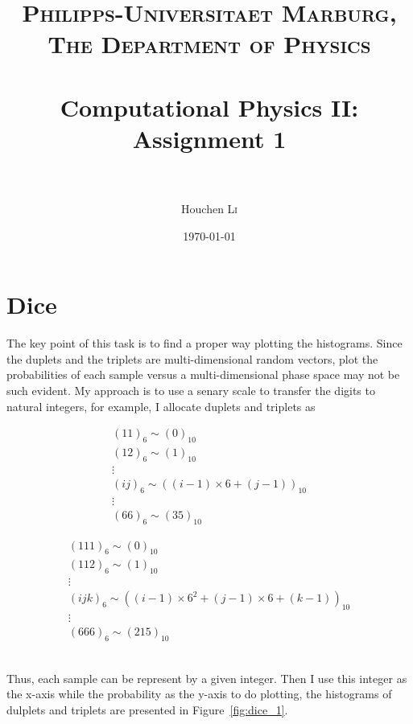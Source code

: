 \documentclass[paper=a4, fontsize=11pt]{scrartcl} %
\title{	
	\normalfont \normalsize 
	\textsc{Philipps-Universitaet Marburg, The Department of Physics} \\ [25pt] %
	\horrule{0.5pt} \\[0.4cm] %
	\huge Computational Physics II: Assignment 1 \\ %
	\horrule{2pt} \\[0.5cm] %
}
\author{Houchen \textsc{Li}} %
\date{\normalsize\today} %
\numberwithin{equation}{section} %
\numberwithin{figure}{section} %
\numberwithin{table}{section} %
\begin{document}
\maketitle %


\section{Dice}

The key point of this task is to find a proper way plotting the histograms. Since the duplets and the triplets are multi-dimensional random vectors, plot the probabilities of each sample versus a multi-dimensional phase space may not be such evident. My approach is to use a senary scale to transfer the digits to natural integers, for example, I allocate duplets and triplets as \\
\begin{minipage}[b]{0.4\linewidth}
\centering
\begin{gather*}
	\left( 11 \right)_6\sim \left(0\right)_{10}\\
	\left( 12 \right)_6\sim \left(1\right)_{10}\\
	\vdots\\
	\left( ij \right)_6\sim \left( \left(i-1\right)\times 6+\left(j-1\right) \right)_{10}\\
	\vdots\\
	\left( 66 \right)_6\sim \left(35\right)_{10}
\end{gather*}
\end{minipage}
\begin{minipage}[b]{0.59\linewidth}
\centering
\begin{gather*}
	\left( 111 \right)_6\sim \left(0\right)_{10}\\
	\left( 112 \right)_6\sim \left(1\right)_{10}\\
	\vdots\\
	\left( ijk \right)_6\sim \left( \left(i-1\right)\times 6^2+\left(j-1\right)\times 6+\left(k-1\right) \right)_{10}\\
	\vdots\\
	\left( 666 \right)_6\sim \left(215\right)_{10}
\end{gather*}
\end{minipage} \\
Thus, each sample can be represent by a given integer. Then I use this integer as the x-axis while the probability as the y-axis to do plotting, the histograms of dulplets and triplets are presented in Figure~\ref{fig:dice_1}. \par
\end{document}
